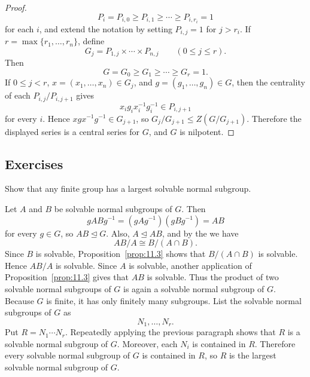 \documentclass[../Odyssey_Project.tex]{subfiles}
\begin{document}
\begin{proof}
\[        P_i=P_{i,0}\geq P_{i,1}\geq \cdots \geq P_{i,r_i}=1
    \]
    for each $i$, and extend the notation by setting $P_{i,j}=1$ for $j>r_i$. If $r=\max\{r_1,\ldots,r_n\}$, define
    \[
        G_j=P_{1,j}\times \cdots \times P_{n,j}
        \qquad
        (0\leq j\leq r).
    \]
    Then
    \[
        G=G_0\geq G_1\geq \cdots \geq G_r=1.
    \]
    If $0\leq j<r$, $x=(x_1,\ldots,x_n)\in G_j$, and $g=(g_1,\ldots,g_n)\in G$, then the centrality of each $P_{i,j}/P_{i,j+1}$ gives
    \[
        x_ig_ix_i^{-1}g_i^{-1}\in P_{i,j+1}
    \]
    for every $i$. Hence $xgx^{-1}g^{-1}\in G_{j+1}$, so $G_j/G_{j+1}\leq Z(G/G_{j+1})$. Therefore the displayed series is a central series for $G$, and $G$ is nilpotent.
\end{proof}

\subsection*{Exercises}

\begin{exercise}
\label{ex:11.1}
Show that any finite group has a largest solvable normal subgroup.
\end{exercise}
\begin{solution}
    Let $A$ and $B$ be solvable normal subgroups of $G$. Then
    \[
        gABg^{-1}=(gAg^{-1})(gBg^{-1})=AB
    \]
    for every $g\in G$, so $AB\trianglelefteq G$. Also, $A\trianglelefteq AB$, and by the  we have
    \[
        AB/A\cong B/(A\cap B).
    \]
    Since $B$ is solvable, Proposition~\ref{prop:11.3} shows that $B/(A\cap B)$ is solvable. Hence $AB/A$ is solvable. Since $A$ is solvable, another application of Proposition~\ref{prop:11.3} gives that $AB$ is solvable. Thus the product of two solvable normal subgroups of $G$ is again a solvable normal subgroup of $G$.\\
    Because $G$ is finite, it has only finitely many subgroups. List the solvable normal subgroups of $G$ as
    \[
        N_1,\ldots,N_r.
    \]
    Put $R=N_1\cdots N_r$. Repeatedly applying the previous paragraph shows that $R$ is a solvable normal subgroup of $G$. Moreover, each $N_i$ is contained in $R$. Therefore every solvable normal subgroup of $G$ is contained in $R$, so $R$ is the largest solvable normal subgroup of $G$.
\end{solution}
\end{document}
